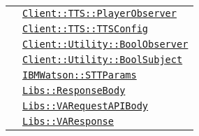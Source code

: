 \begin{longtable}{|>{\centering}m{3cm}|m{10cm}<{\centering}|}
& \hyperref[Client::TTS::PlayerObserver]{\texttt{Client::TTS::PlayerObserver}}\\
& \hyperref[Client::TTS::TTSConfig]{\texttt{Client::TTS::TTSConfig}}\\
& \hyperref[Client::Utility::BoolObserver]{\texttt{Client::Utility::BoolObserver}}\\
& \hyperref[Client::Utility::BoolSubject]{\texttt{Client::Utility::BoolSubject}}\\
& \hyperref[IBMWatson::STTParams]{\texttt{IBMWatson::STTParams}}\\
& \hyperref[Libs::ResponseBody]{\texttt{Libs::ResponseBody}}\\
& \hyperref[Libs::VARequestAPIBody]{\texttt{Libs::VARequestAPIBody}}\\
& \hyperref[Libs::VAResponse]{\texttt{Libs::VAResponse}}\\ \hline


\end{longtable}
